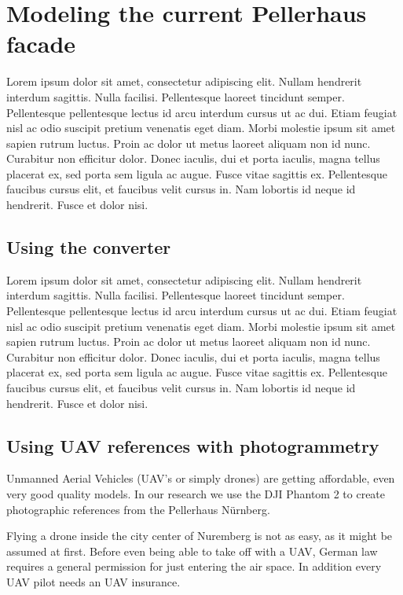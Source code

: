 \section{Modeling the current Pellerhaus facade}

Lorem ipsum dolor sit amet, consectetur adipiscing elit. Nullam hendrerit interdum sagittis. Nulla facilisi. Pellentesque laoreet tincidunt semper. Pellentesque pellentesque lectus id arcu interdum cursus ut ac dui. Etiam feugiat nisl ac odio suscipit pretium venenatis eget diam. Morbi molestie ipsum sit amet sapien rutrum luctus. Proin ac dolor ut metus laoreet aliquam non id nunc. Curabitur non efficitur dolor. Donec iaculis, dui et porta iaculis, magna tellus placerat ex, sed porta sem ligula ac augue. Fusce vitae sagittis ex. Pellentesque faucibus cursus elit, et faucibus velit cursus in. Nam lobortis id neque id hendrerit. Fusce et dolor nisi\parencite{dp_lidar}.

\subsection{Using the converter}

Lorem ipsum dolor sit amet, consectetur adipiscing elit. Nullam hendrerit interdum sagittis. Nulla facilisi. Pellentesque laoreet tincidunt semper. Pellentesque pellentesque lectus id arcu interdum cursus ut ac dui. Etiam feugiat nisl ac odio suscipit pretium venenatis eget diam. Morbi molestie ipsum sit amet sapien rutrum luctus. Proin ac dolor ut metus laoreet aliquam non id nunc. Curabitur non efficitur dolor. Donec iaculis, dui et porta iaculis, magna tellus placerat ex, sed porta sem ligula ac augue. Fusce vitae sagittis ex. Pellentesque faucibus cursus elit, et faucibus velit cursus in. Nam lobortis id neque id hendrerit. Fusce et dolor nisi\parencite{dp_lidar}.

\subsection{Using UAV references with photogrammetry}

Unmanned Aerial Vehicles (UAV's or simply drones) are getting affordable, even very good quality models. In our research we use the DJI Phantom 2 to create photographic references from the Pellerhaus Nürnberg.

Flying a drone inside the city center of Nuremberg is not as easy, as it might be assumed at first. Before even being able to take off with a UAV, German law requires a general permission for just entering the air space. In addition every UAV pilot needs an UAV insurance.

